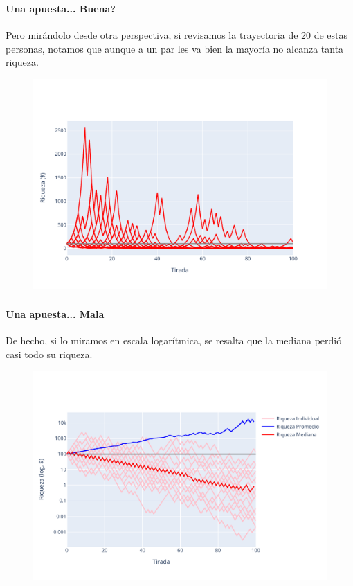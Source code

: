 \documentclass{beamer}
\begin{document}
\begin{frame}
  \frametitle{\SECTIONC}
  \framesubtitle{Una apuesta... Buena?}

  Pero mirándolo desde otra perspectiva, si revisamos la trayectoria de 20 de estas personas, notamos que aunque a un par les va bien la mayoría no alcanza tanta riqueza.

  \begin{figure}[H]
    \centering
    \includegraphics[scale=0.5]{img/paths.pdf}
  \end{figure}
\end{frame}

\begin{frame}
  \frametitle{\SECTIONC}
  \framesubtitle{Una apuesta... Mala}

  De hecho, si lo miramos en escala logarítmica, se resalta que la mediana perdió casi todo su riqueza.

  \begin{figure}[H]
    \centering
    \includegraphics[scale=0.5]{img/logPaths.pdf}
  \end{figure}
\end{frame}
\end{document}
